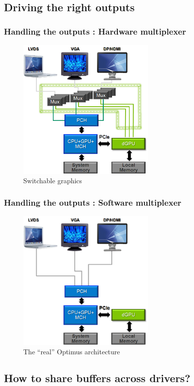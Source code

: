 \documentclass[11pt,english,compress]{beamer}
\begin{document}
\subsection{Driving the right outputs}
\begin{frame}
	\frametitle{Handling the outputs : Hardware multiplexer}

	\begin{figure}[h]
		\centering
		\includegraphics[height=7cm]{imgs/optimus_hw_mux.png}
		\caption{Switchable graphics}
	\end{figure}
\end{frame}

\begin{frame}
	\frametitle{Handling the outputs : Software multiplexer}

	\begin{figure}[h]
		\centering
		\includegraphics[height=7cm]{imgs/optimus_sw_mux.png}
		\caption{The ``real'' Optimus architecture}
	\end{figure}
\end{frame}

\subsection{How to share buffers across drivers?}
\end{document}
